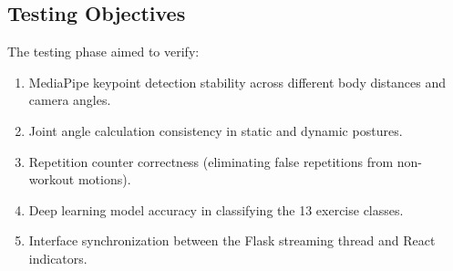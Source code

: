 \subsection{Testing Objectives}
The testing phase aimed to verify:
\begin{enumerate}
    \item MediaPipe keypoint detection stability across different body distances and camera angles.
    \item Joint angle calculation consistency in static and dynamic postures.
    \item Repetition counter correctness (eliminating false repetitions from non-workout motions).
    \item Deep learning model accuracy in classifying the 13 exercise classes.
    \item Interface synchronization between the Flask streaming thread and React indicators.
\end{enumerate}

